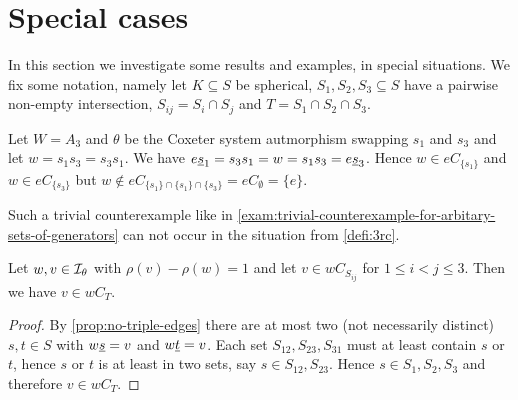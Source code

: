 \section{Special cases}
\label{sec:3rc-special-cases}

%
%		

In this section we investigate some results and examples, in special situations. We fix some notation, namely let $K \subseteq S$ be spherical, $S_1,S_2,S_3 \subseteq S$ have a pairwise non-empty intersection, $S_{ij} = S_i \cap S_j$ and $T = S_1 \cap S_2 \cap S_3$.

\begin{exam}
	Let $W = A_3$ and $\theta$ be the Coxeter system autmorphism swapping $s_1$ and $s_3$ and let $w = s_1s_3 = s_3s_1$. We have $e \underline{s}_1 = s_3 s_1 = w = s_1 s_3 = e \underline{s}_3$. Hence $w \in eC_{\{s_1\}}$ and $w \in eC_{\{s_3\}}$ but $w \notin eC_{\{s_1\} \cap \{s_1\} \cap \{s_3\}} = eC_\emptyset = \{e\}$.
\end{exam}

Such a trivial counterexample like in \ref{exam:trivial-counterexample-for-arbitary-sets-of-generators} can not occur in the situation from \ref{defi:3rc}.

\begin{prop}
	Let $w,v \in \mathcal{I}_{\theta}$ with $\rho(v) - \rho(w) = 1$ and let $v \in w C_{S_{ij}}$ for $1 \leq i < j \leq 3$. Then we have $v \in wC_T$.

	\begin{proof}
		By \ref{prop:no-triple-edges} there are at most two (not necessarily distinct) $s,t \in S$ with $w \underline{s} = v$ and $w \underline{t} = v$. Each set $S_{12},S_{23},S_{31}$ must at least contain $s$ or $t$, hence $s$ or $t$ is at least in two sets, say $s \in S_{12},S_{23}$. Hence $s \in S_1,S_2,S_3$ and therefore $v \in wC_T$.
	\end{proof}
\end{prop}

